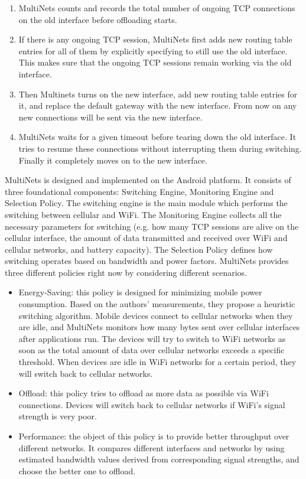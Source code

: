 \documentclass[english]{tktltiki}
\begin{document}
\begin{enumerate}
  \item MultiNets counts and records the total number of ongoing TCP connections on the old interface before offloading starts.
  \item If there is any ongoing TCP session, MultiNets first adds new routing table entries for all of them by explicitly specifying to still use the old interface. This makes sure that the ongoing TCP sessions remain working via the old interface.
  \item Then Multinets turns on the new interface, add new routing table entries for it, and replace the default gateway with the new interface. From now on any new connections will be sent via the new interface.
  \item MultiNets waits for a given timeout before tearing down the old interface. It tries to resume these connections without interrupting them during switching. Finally it completely moves on to the new interface.
\end{enumerate}

MultiNets is designed and implemented on the Android platform. It consists of three foundational components: Switching Engine, Monitoring Engine and Selection Policy. The switching engine is the main module which performs the switching between cellular and WiFi. The Monitoring Engine collects all the necessary parameters for switching (e.g. how many TCP sessions are alive on the cellular interface, the amount of data transmitted and received over WiFi and cellular networks, and battery capacity). The Selection Policy defines how switching operates based on bandwidth and power factors. MultiNets provides three different policies right now by considering different scenarios.

\begin{itemize}
  \item Energy-Saving: this policy is designed for minimizing mobile power consumption. Based on the authors' measurements, they propose a heuristic switching algorithm. Mobile devices connect to cellular networks when they are idle, and MultiNets monitors how many bytes sent over cellular interfaces after applications run. The devices will try to switch to WiFi networks as soon as the total amount of data over cellular networks exceeds a specific threshold. When devices are idle in WiFi networks for a certain period, they will switch back to cellular networks.
  \item Offload: this policy tries to offload as more data as possible via WiFi connections. Devices will switch back to cellular networks if WiFi's signal strength is very poor.
  \item Performance: the object of this policy is to provide better throughput over different networks. It compares different interfaces and networks by using estimated bandwidth values derived from corresponding signal strengths, and choose the better one to offload.
\end{itemize}
\end{document}
